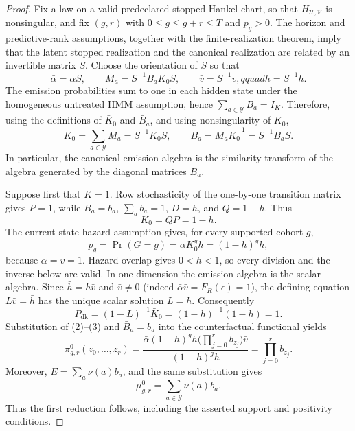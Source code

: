 \documentclass{article}
\begin{document}
\begin{proof}
Fix a law on a valid predeclared stopped-Hankel chart, so that \(H_{\mathcal U,\mathcal V}\) is nonsingular, and fix \((g,r)\) with \(0\leq g\leq g+r\leq T\) and \(p_g>0\).  The horizon and predictive-rank assumptions, together with the finite-realization theorem, imply that the latent stopped realization and the canonical realization are related by an invertible matrix \(S\).  Choose the orientation of \(S\) so that
\[
 \bar\alpha=\alpha S,\qquad
 \bar M_a=S^{-1}B_aK_0S,\qquad
 \bar v=S^{-1}v,qquad
 \bar h=S^{-1}h.
\]
The emission probabilities sum to one in each hidden state under the homogeneous untreated HMM assumption, hence \(\sum_{a\in\mathcal Y}B_a=I_K\).  Therefore, using the definitions of \(\bar K_0\) and \(\bar B_a\), and using nonsingularity of \(K_0\),
\[
 \bar K_0=\sum_{a\in\mathcal Y}\bar M_a
 =S^{-1}K_0S,
 \qquad
 \bar B_a=\bar M_a\bar K_0^{-1}=S^{-1}B_aS.                                      \tag{1}
\]
In particular, the canonical emission algebra is the similarity transform of the algebra generated by the diagonal matrices \(B_a\).

Suppose first that \(K=1\).  Row stochasticity of the one-by-one transition matrix gives \(P=1\), while \(B_a=b_a\), \(\sum_a b_a=1\), \(D=h\), and \(Q=1-h\).  Thus
\[
 K_0=QP=1-h.
\]
The current-state hazard assumption gives, for every supported cohort \(g\),
\[
 p_g=\Pr(G=g)=\alpha K_0^g h=(1-h)^g h,                                      \tag{2}
\]
because \(\alpha=v=1\).  Hazard overlap gives \(0<h<1\), so every division and the inverse below are valid.  In one dimension the emission algebra is the scalar algebra.  Since \(\bar h=h\bar v\) and \(\bar v\neq0\) (indeed \(\bar\alpha\bar v=F_R(\epsilon)=1\)), the defining equation \(L\bar v=\bar h\) has the unique scalar solution \(L=h\).  Consequently
\[
 P_{\mathrm{dk}}=(1-L)^{-1}\bar K_0=(1-h)^{-1}(1-h)=1.                         \tag{3}
\]
Substitution of (2)--(3) and \(\bar B_a=b_a\) into the counterfactual functional yields
\[
 \pi^0_{g,r}(z_0,\ldots,z_r)
 =\frac{\bar\alpha(1-h)^gh\bigl(\prod_{j=0}^r b_{z_j}\bigr)\bar v}
 {(1-h)^gh}
 =\prod_{j=0}^r b_{z_j}.                                                        \tag{4}
\]
Moreover, \(E=\sum_a\nu(a)b_a\), and the same substitution gives
\[
 \mu^0_{g,r}=\sum_{a\in\mathcal Y}\nu(a)b_a.                                  \tag{5}
\]
Thus the first reduction follows, including the asserted support and positivity conditions.


\end{proof}
\end{document}
